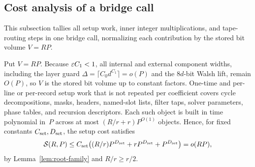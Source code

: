 \subsection{Cost analysis of a bridge call}\label{sec:main-tables}

This subsection tallies all setup work, inner integer multiplications, and tape-routing steps in one bridge call,
normalizing each contribution by the stored bit volume $V=RP$.

Put $V=RP$. Because $\varepsilon C_1<1$, all internal and external component widths, including the layer guard
$\Delta=\lceil C_0d^{C_1}\rceil=o(P)$ and the $8d$-bit Walsh lift, remain $O(P)$, so $V$ is the stored bit volume up to
constant factors. One-time and per-line or per-record setup work that is not repeated per coefficient covers cycle
decompositions, masks, headers, named-slot lists, filter taps, solver parameters, phase tables, and recursion
descriptors. Each such object is built in time polynomial in~$P$ across at most $(R/r+r)P^{O(1)}$ objects. Hence, for
fixed constants $C_{\rm set},D_{\rm set}$, the setup cost satisfies
\begin{equation}\label{eq:setup}
  \mathcal S(R,P)\le C_{\rm set}\bigl((R/r)P^{D_{\rm set}}+rP^{D_{\rm set}}+P^{D_{\rm set}}\bigr)=o(RP),
\end{equation}
by Lemma~\ref{lem:root-family} and $R/r\ge r/2$.

